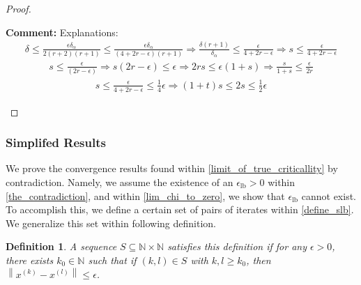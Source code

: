\documentclass{article}
\newenvironment{comment}
  {\par\medskip
   \color{red}%
   \begin{framed}
   \textbf{Comment: }\ignorespaces}
 {\end{framed}
  \medskip}
\newtheorem{definition}[theorem]{Definition}
\theoremstyle{case}
\numberwithin{theorem}{subsection}
\newcommand{\naturals}{\mathbb N}
\newcommand{\xk}{x^{(k)}}
\newcommand{\xl}{{x^{(l)}}}
\begin{document}
\begin{proof}
\begin{comment}
Explanations:
\begin{align*}
\delta \le \frac{\epsilon\delta_{\alpha}}{2(r+2)(r + 1)}
\le \frac{\epsilon\delta_{\alpha}}{(4 + 2r - \epsilon)(r + 1)} 
\Longrightarrow \frac{\delta(r + 1)}{\delta_{\alpha}}  \le \frac{\epsilon}{4 + 2r - \epsilon} \Longrightarrow
s\le \frac{\epsilon}{4 + 2r - \epsilon}
\end{align*}
\begin{align*}
s\le \frac{\epsilon}{(2r - \epsilon)} \Longrightarrow
s(2r - \epsilon)\le \epsilon \Longrightarrow
2rs \le \epsilon(1 + s) \Longrightarrow
\frac {s}{1 + s} \le \frac {\epsilon} {2r}
\end{align*}
\begin{align*}
s \le \frac{\epsilon}{4 + 2r - \epsilon} \le \frac 1 4 \epsilon \Longrightarrow
(1 + t)s \le 2s \le \frac 1 2 \epsilon
\end{align*}
\end{comment}
\end{proof}

\subsubsection{Simplifed Results}
\label{simplifed_bounded_projection}

We prove the convergence results found within \cref{limit_of_true_criticallity} by contradiction.
Namely, we assume the existence of an $\epsilon_{\textrm{lb}} > 0$ within \cref{the_contradiction}, 
and within \cref{lim_chi_to_zero}, we show that $\epsilon_{\textrm{lb}}$ cannot exist.
To accomplish this, we define a certain set of pairs of iterates within \cref{define_slb}.
We generalize this set within following definition.

\begin{definition}
\label{criteria_from_contradiction}
A sequence $S \subseteq\naturals \times \naturals$ satisfies this definition if
for any $\epsilon > 0$, there exists $k_0 \in \naturals$ such that if $(k, l) \in S$ with $k, l \ge k_0$, 
then 
$\left\|\xk - \xl \right\| \le \epsilon$.
\end{definition}
\end{document}
